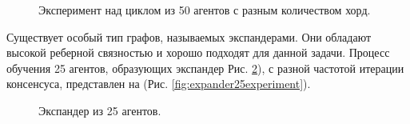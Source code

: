\documentclass[a4paper,article,14pt]{extarticle}
\begin{document}
\begin{figure}[H]
\begin{center}
\caption{
\label{fig:cycle50agents}
     Эксперимент над циклом из 50 агентов с разным количеством хорд.}
\end{center}
\end{figure}

Существует особый тип графов, называемых экспандерами. Они обладают высокой реберной связностью и хорошо подходят для данной задачи. Процесс обучения 25 агентов, образующих экспандер Рис. \ref{fig:expander25}), с разной частотой итерации консенсуса, представлен на (Рис. \ref{fig:expander25experiment}).

\begin{figure}[H]
\begin{center}
\caption{ \label{fig:expander25}
     Экспандер из 25 агентов.}
\end{center}
\end{figure}
\end{document}
